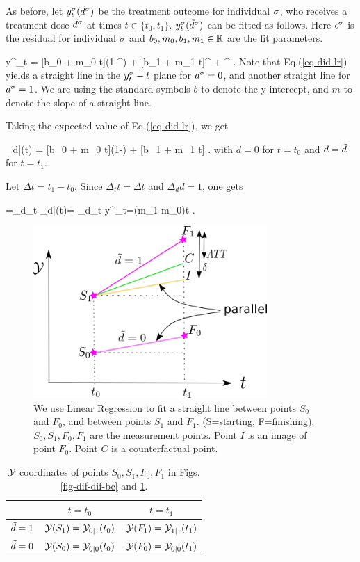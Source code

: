 As before, let
$y^\sigma_t({\tilde{d}}^\sigma)$ be the treatment outcome
for individual $\sigma$,
who receives
a treatment dose
${\tilde{d}}^\sigma$
at times $t\in\{t_0, t_1\}$.
$y^\sigma_t({\tilde{d}}^\sigma)$
can be fitted as follows.
Here $\epsilon^\sigma$
is the residual
for individual $\sigma$
and $b_0, m_0, b_1, m_1\in { \mathbb{R}}$
are the fit parameters.

%
\beq
y^\s_t = [b_0 + m_0 t](1-\td^\s)
+  [b_1 + m_1 t]\td^\s
+ \eps^\s
\;.
\label{eq-did-lr}
\eeq  
Note that Eq.(\ref{eq-did-lr})
 yields a straight line
in the $y^\sigma_t-t$ plane
for $d^\sigma=0$,
and another 
straight line for $d^\sigma=1$.
We are
using the
standard symbols
$b$ to denote
the y-intercept, and $m$ 
to denote the slope
of a straight line.

Taking the expected value
of Eq.(\ref{eq-did-lr}), we get

\beq
\caly_{d|\td}(t) = 
[b_0 + m_0 t](1-\td)
+  [b_1 + m_1 t]\td
\;.
\eeq  
with $d=0$ for $t=t_0$
and $d={\tilde{d}}$ for $t=t_1$.

Let $\Delta t=t_1-t_0$. Since
$\Delta_t t=\Delta t$ and $\Delta_d d=1$, one gets

\beq
\delta=\Delta_d\Delta_t \calm\caly_{d|\td}(t)=
\Delta_d\Delta_t y^\s_t=(m_1-m_0)\Delta t
\;.
\eeq



\begin{figure}[h!]
\centering
\includegraphics[width=3.5in]
{did/parallel-trends.png}
\caption{We use
Linear Regression
to fit a straight line
between points $S_0$
and $F_0$,
and between points
$S_1$ and $F_1$.
(S=starting, F=finishing).
$S_0, S_1, F_0, F_1$ are the measurement points.
Point
$I$ is an image of point $F_0$.
Point $C$ is a counterfactual point.
} 
\label{fig-parallel-trends}
\end{figure}

\begin{table}[h!]
\centering
{\renewcommand{\arraystretch}{1.2}
\begin{tabular}{|c|c|c|}
\hline 
\rowcolor[HTML]{ECF4FF} 
 & $t=t_0$ & $t=t_1$ \\ 
\hline
${\tilde{d}}=1$ \cellcolor[HTML]{ECF4FF}& ${\cal Y}(S_1)={\cal Y}_{0|1}(t_0)$ & ${\cal Y}(F_1)={\cal Y}_{1|1}(t_1)$ \\ 
\hline 
${\tilde{d}}=0$\cellcolor[HTML]{ECF4FF} & ${\cal Y}(S_0)={\cal Y}_{0|0}(t_0)$ & ${\cal Y}(F_0)={\cal Y}_{0|0}(t_1)$ \\ 
\hline 
\end{tabular}
}
\caption{
${\cal Y}$ coordinates
of points
$S_0, S_1, F_0, F_1$
in Figs.\ref{fig-dif-dif-bc}
 and \ref{fig-parallel-trends}.
}
\label{tab-did-points}
\end{table}




